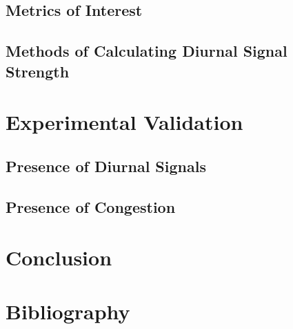 \documentclass[sigconf]{acmart}
\begin{document}
\subsection{Metrics of Interest}
\subsection{Methods of Calculating Diurnal Signal Strength}

\section{Experimental Validation}
\subsection{Presence of Diurnal Signals}
\subsection{Presence of Congestion}

\section{Conclusion}

\section{Bibliography}
\end{document}
